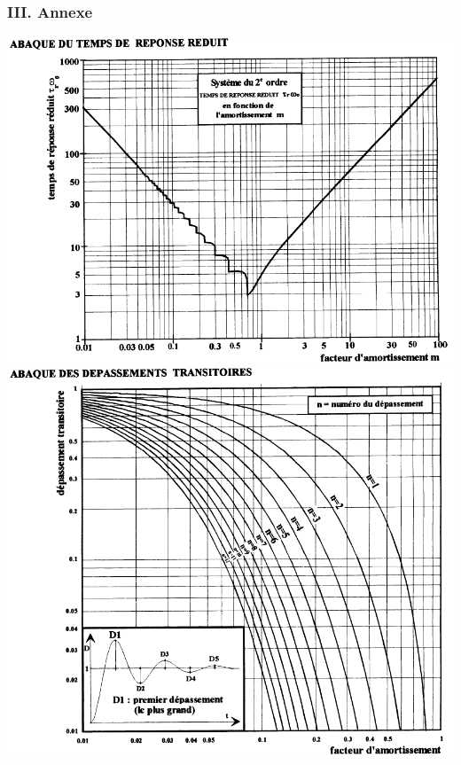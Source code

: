 \subsubsection{III. Annexe}
\begin{center}
\includegraphics[scale=0.4]{png/image5_prob4.png}\\
\includegraphics[scale=0.4]{png/image6_prob4.png}
\end{center}

